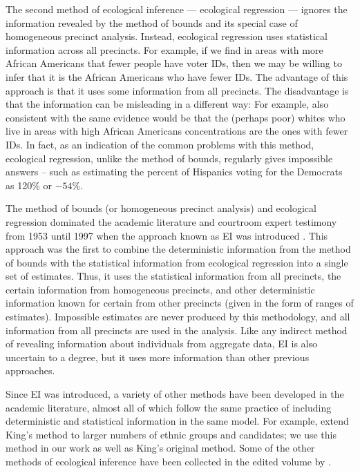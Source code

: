 \documentclass[12pt]{article}
\begin{document}
The second method of ecological inference --- ecological regression
--- ignores the information revealed by the method of bounds and its
special case of homogeneous precinct analysis. Instead, ecological
regression uses statistical information across all precincts. For
example, if we find in areas with more African Americans that fewer
people have voter IDs, then we may be willing to infer that it is the
African Americans who have fewer IDs. The advantage of this approach
is that it uses some information from all precincts. The disadvantage
is that the information can be misleading in a different way: For
example, also consistent with the same evidence would be that the
(perhaps poor) whites who live in areas with high African Americans
concentrations are the ones with fewer IDs. In fact, as an indication
of the common problems with this method, ecological regression, unlike
the method of bounds, regularly gives impossible answers -- such as
estimating the percent of Hispanics voting for the Democrats as 120\%
or $-54$\%.

The method of bounds (or homogeneous precinct analysis) and ecological
regression dominated the academic literature and courtroom expert
testimony from 1953 until 1997 when the approach known as EI was
introduced \citep{King97}. This approach was the first to combine the
deterministic information from the method of bounds with the
statistical information from ecological regression into a single set
of estimates. Thus, it uses the statistical information from all
precincts, the certain information from homogeneous precincts, and
other deterministic information known for certain from other precincts
(given in the form of ranges of estimates).  Impossible estimates are
never produced by this methodology, and all information from all
precincts are used in the analysis. Like any indirect method of
revealing information about individuals from aggregate data, EI is
also uncertain to a degree, but it uses more information than other
previous approaches.

Since EI was introduced, a variety of other methods have been
developed in the academic literature, almost all of which follow the
same practice of including deterministic and statistical information
in the same model.  For example, \citet{RosJiaKin01} extend King's
method to larger numbers of ethnic groups and candidates; we use this
method in our work as well as King's original method. Some of the
other methods of ecological inference have been collected in the
edited volume by \citet{KinRosTan04b}.
\end{document}
